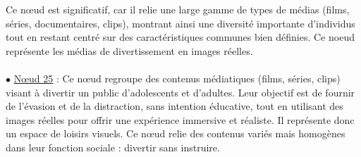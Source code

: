 \documentclass{article}
\begin{document}
Ce nœud est significatif, car il relie une large gamme de types de médias (films, séries, documentaires, clips), montrant ainsi une diversité importante d'individus tout en restant centré sur des caractéristiques communes bien définies. Ce noeud représente les médias de divertissement en images réelles.
\\\\
\noindent $\bullet$ \underline{Nœud 25} : Ce nœud regroupe des contenus médiatiques (films, séries, clips) visant à divertir un public d'adolescents et d'adultes. Leur objectif est de fournir de l’évasion et de la distraction, sans intention éducative, tout en utilisant des images réelles pour offrir une expérience immersive et réaliste.
Il représente donc un espace de loisirs visuels. Ce nœud relie des contenus variés mais homogènes dans leur fonction sociale : divertir sans instruire.
\end{document}

